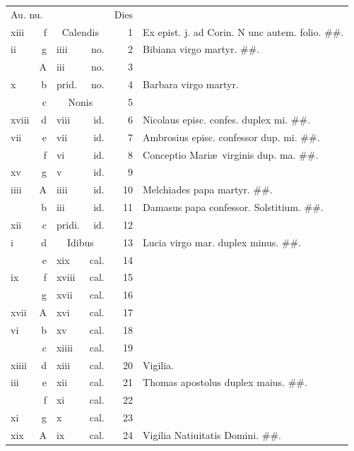 \documentclass[a5paper,10pt]{book}
\def\ae{æ}
\begin{document}
\begin{center}
\begin{tabular}{l r l r r l}
\multicolumn{2}{l}{\color{red}Au. nu.} & & & \color{red} Dies & \\
xiii & f & \multicolumn{2}{c}{\color{red} Calendis} & 1 & Ex epist. j. ad Corin. \color{red} N\color{black} unc autem. folio. \#\#.\\%
ii & g & iiii & no. & 2 & Bibiana virgo martyr. \#\#.\\
 & \color{red} A & iii & no. & 3 & \\
x & b & \color{red} prid. & no. & 4 & Barbara virgo martyr. \color{black}\\
 & c & \multicolumn{2}{c}{\color{red} Nonis} & 5 & \\
xviii & d & viii & id. & 6 & \color{red} Nicolaus episc. confes. duplex mi. \color{black} \#\#.\\
vii & e & vii & id. & 7 & Ambrosius episc. confessor dup. mi. \color{black} \#\#.\\
 & f & vi & id. & 8 & \color{red} Conceptio Mari\ae \ virginis dup. ma. \color{black} \#\#.\\
xv & g & v & id. & 9 & \\
iiii & \color{red} A & iiii & id. & 10 & Melchiades papa martyr. \#\#.\\
 & b & iii & id. & 11 & Damasus papa confessor. Solstitium. \#\#.\\%
xii & c & \color{red} pridi. & id. & 12 & \\
i & d & \multicolumn{2}{c}{\color{red} Idibus} & 13 & Lucia virgo mar. duplex minus. \#\#.\\
 & e & xix & cal. & 14 & \\
ix & f & xviii & cal. & 15 & \\
 & g & xvii & cal. & 16 & \\
xvii & \color{red} A & xvi & cal. & 17 & \\
vi & b & xv & cal. & 18 & \\
 & c & xiiii & cal. & 19 & \\
xiiii & d & xiii & cal. & 20 & \qquad \qquad \qquad \color{red} Vigilia.\\
iii & e & xii & cal. & 21 & \color{red} Thomas apostolus duplex maius. \color{black} \#\#.\\
 & f & xi & cal. & 22 & \\
xi & g & x & cal. & 23 & \\
xix & \color{red} A & ix & cal. & 24 & \qquad \quad \color{red} Vigilia Natiuitatis Domini. \color{black} \#\#.\\

\end{tabular}
\end{center}
\end{document}
